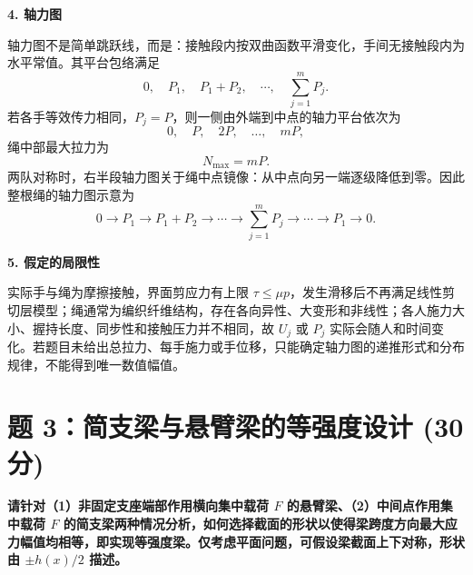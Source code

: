\documentclass[11pt,a4paper]{ctexrep}
\begin{document}
{\textbf{4. 轴力图}

轴力图不是简单跳跃线，而是：接触段内按双曲函数平滑变化，手间无接触段内为水平常值。其平台包络满足
\[
0,\quad P_1,\quad P_1+P_2,\quad \cdots,\quad \sum_{j=1}^{m}P_j.
\]
若各手等效传力相同，$P_j=P$，则一侧由外端到中点的轴力平台依次为
\[
0,\quad P,\quad 2P,\quad \ldots,\quad mP,
\]
绳中部最大拉力为
\[
N_{\max}=mP.
\]
两队对称时，右半段轴力图关于绳中点镜像：从中点向另一端逐级降低到零。因此整根绳的轴力图示意为
\[
0 \longrightarrow P_1 \longrightarrow P_1+P_2 \longrightarrow \cdots
\longrightarrow \sum_{j=1}^{m}P_j
\longrightarrow \cdots \longrightarrow P_1 \longrightarrow 0.
\]

\textbf{5. 假定的局限性}

实际手与绳为摩擦接触，界面剪应力有上限 $\tau\le\mu p$，发生滑移后不再满足线性剪切层模型；绳通常为编织纤维结构，存在各向异性、大变形和非线性；各人施力大小、握持长度、同步性和接触压力并不相同，故 $U_j$ 或 $P_j$ 实际会随人和时间变化。若题目未给出总拉力、每手施力或手位移，只能确定轴力图的递推形式和分布规律，不能得到唯一数值幅值。




\section*{题 3：简支梁与悬臂梁的等强度设计 (30 分)}

\textbf{请针对（1）非固定支座端部作用横向集中载荷 $F$ 的悬臂梁、（2）中间点作用集中载荷 $F$ 的简支梁两种情况分析，如何选择截面的形状以使得梁跨度方向最大应力幅值均相等，即实现等强度梁。仅考虑平面问题，可假设梁截面上下对称，形状由 $\pm h(x)/2$ 描述。}

\begin{center}
\end{center}}
\end{document}

